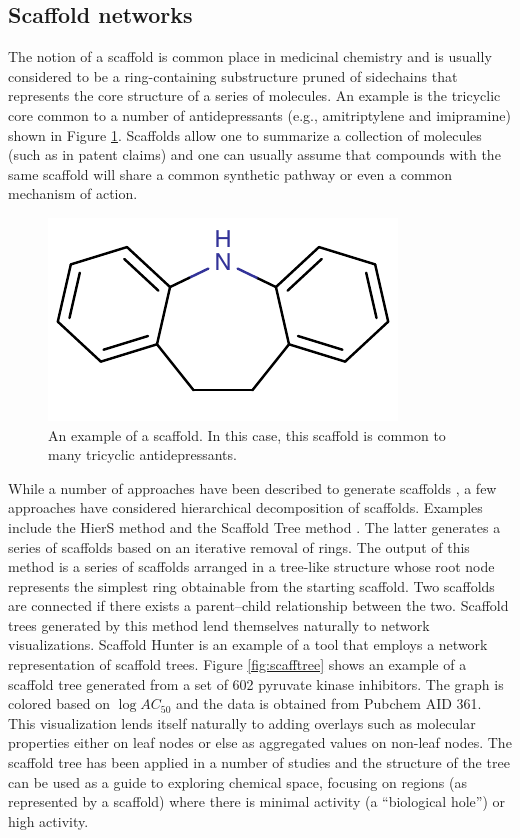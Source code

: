 \documentclass[]{book}
\begin{document}
\subsection{Scaffold networks}
\label{sec:scaffold-networks}

The notion of a scaffold is common place in medicinal chemistry and is
usually considered to be a ring-containing substructure pruned of
sidechains that represents the core structure of a series of
molecules. An example is the tricyclic core common to a number of
antidepressants (e.g., amitriptylene and imipramine) shown in Figure
\ref{fig:tca-core}. Scaffolds allow one to summarize a collection of
molecules (such as in patent claims) and one can usually assume that
compounds with the same scaffold will share a common synthetic pathway
or even a common mechanism of action.
\begin{figure}[h]
  \centering
  \includegraphics{img/tca-core}
  \caption{An example of a scaffold. In this case, this
  scaffold is common to many tricyclic antidepressants.}
  \label{fig:tca-core}
\end{figure}


While a number of approaches have been described to generate scaffolds
\cite{Lewell:1998aa,Bemis:1996aa,Katritzky:2000wf}, a few approaches
have considered hierarchical decomposition of scaffolds. Examples
include the HierS method \cite{Wilkens:2005il} and the Scaffold Tree
method \cite{Schuffenhauer:2007oz}. The latter generates a series of
scaffolds based on an iterative removal of rings. The output of this
method is a series of scaffolds arranged in a tree-like structure
whose root node represents the simplest ring obtainable from the
starting scaffold.  Two scaffolds are connected if there exists a
parent--child relationship between the two. Scaffold trees generated
by this method lend themselves naturally to network
visualizations. Scaffold Hunter \cite{Wetzel:2009uq} is an example of
a tool that employs a network representation of scaffold trees. Figure
\ref{fig:scafftree} shows an example of a scaffold tree generated from
a set of 602 pyruvate kinase inhibitors. The graph is colored based on
$\log AC_{50}$ and the data is obtained from Pubchem AID 361. This
visualization lends itself naturally to adding overlays such as
molecular properties either on leaf nodes or else as aggregated values
on non-leaf nodes. The scaffold tree has been applied in a number of
studies \cite{Wetzel:2009uq,Renner:2009wm} and the structure of the
tree can be used as a guide to exploring chemical space, focusing on
regions (as represented by a scaffold) where there is minimal activity
(a ``biological hole'') or high activity.
\end{document}
